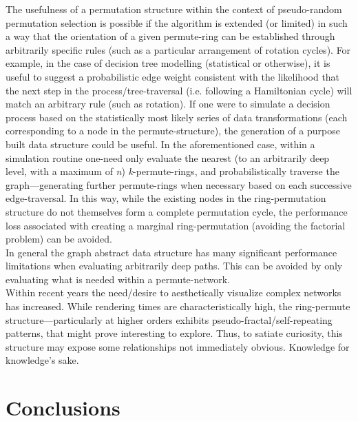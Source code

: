 \documentclass[12pt]{article}
\begin{document}
The usefulness of a permutation structure within the context of pseudo-random permutation selection is possible if the algorithm is extended (or limited) in such a way that the orientation of a given permute-ring can be established through arbitrarily specific rules (such as a particular arrangement of rotation cycles).
For example, in the case of decision tree modelling (statistical or otherwise), it is useful to suggest a probabilistic edge weight consistent with the likelihood that the next step in the process/tree-traversal (i.e\@. following a Hamiltonian cycle) will match an arbitrary rule (such as rotation).
If one were to simulate a decision process based on the statistically most likely series of data transformations (each corresponding to a node in the permute-structure),  the generation of a purpose built data structure could be useful. In the aforementioned case, within a simulation routine one-need only evaluate the nearest (to an arbitrarily deep level, with a maximum of \emph{n}) \emph{k}-permute-rings, and probabilistically traverse the graph---generating further permute-rings when necessary based on each successive edge-traversal.
In this way, while the existing nodes in the ring-permutation structure do not themselves form a complete permutation cycle, the performance loss associated with creating a marginal ring-permutation (avoiding the factorial problem) can be avoided.\\

In general the graph abstract data structure has many significant performance limitations when evaluating arbitrarily deep paths.
This can be avoided by only evaluating what is needed within a permute-network.\\
\pagebreak[3]
Within recent years the need/desire to aesthetically visualize complex networks has increased\cite{Lima:2011}.
While rendering times are characteristically high, the ring-permute structure---particularly at higher orders exhibits pseudo-fractal/self-repeating patterns, that might prove interesting to explore.
Thus, to satiate curiosity, this structure may expose some relationships not immediately obvious. Knowledge for knowledge's sake.\\

\newpage
\section{Conclusions}
\setlength{\parindent}{1cm}
\end{document}

